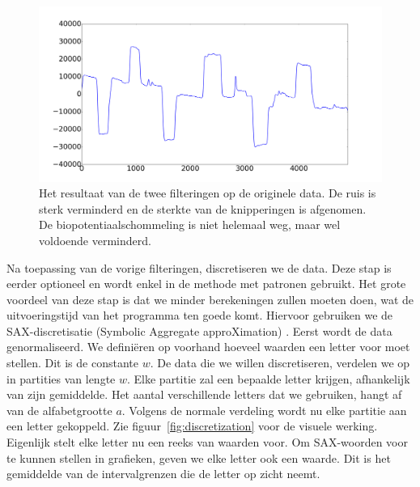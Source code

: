 \documentclass{article}
\begin{document}
\begin{figure}[h]
\centering
\includegraphics[width=\linewidth]{images/filtered_data}
\caption{Het resultaat van de twee filteringen op de originele data. De ruis is sterk verminderd en de sterkte van de knipperingen is afgenomen. De biopotentiaalschommeling is niet helemaal weg, maar wel voldoende verminderd.}
\label{fig:filtereddata}
\end{figure}



Na toepassing van de vorige filteringen, discretiseren we de data. Deze stap is eerder optioneel en wordt enkel in de methode met patronen gebruikt. Het grote voordeel van deze stap is dat we minder berekeningen zullen moeten doen, wat de uitvoeringstijd van het programma ten goede komt. Hiervoor gebruiken we de SAX-discretisatie (Symbolic Aggregate approXimation) \cite{sax}. Eerst wordt de data genormaliseerd. We definiëren op voorhand hoeveel waarden een letter voor moet stellen. Dit is de constante $w$. De data die we willen discretiseren, verdelen we op in partities van lengte $w$. Elke partitie zal een bepaalde letter krijgen, afhankelijk van zijn gemiddelde. Het aantal verschillende letters dat we gebruiken, hangt af van de alfabetgrootte $a$. Volgens de normale verdeling wordt nu elke partitie aan een letter gekoppeld. Zie figuur~\ref{fig:discretization} voor de visuele werking. Eigenlijk stelt elke letter nu een reeks van waarden voor. Om SAX-woorden voor te kunnen stellen in grafieken, geven we elke letter ook een waarde. Dit is het gemiddelde van de intervalgrenzen die de letter op zicht neemt.
\end{document}
